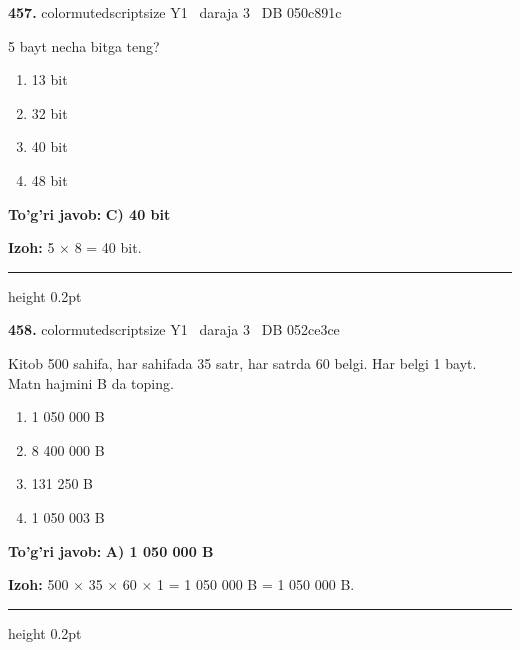 \documentclass[10pt,a4paper,oneside]{article}
\begin{document}
\noindent\textbf{\color{ink}457.}  {color{muted}scriptsize Y1 \textbullet\ daraja 3 \textbullet\ DB 050c891c}
\par
5 bayt necha bitga teng?
\begin{enumerate}[label=\Alph*),leftmargin=9mm]
\item 13 bit
\item 32 bit
\item 40 bit
\item 48 bit
\end{enumerate}
\begin{tcolorbox}[enhanced,breakable,colback=teal!4,colframe=teal!50!black,boxrule=0.5pt,arc=1.1mm,left=3mm,right=3mm,top=1.7mm,bottom=1.7mm,before skip=2mm,after skip=2mm]
\textbf{\color{teal}To'g'ri javob:} \textbf{C) 40 bit}
\par\smallskip
\textbf{Izoh:} 5 \ensuremath{\times} 8 = 40 bit.
\end{tcolorbox}
\vspace{2mm}\hrule height 0.2pt \vspace{3mm}

\noindent\textbf{\color{ink}458.}  {color{muted}scriptsize Y1 \textbullet\ daraja 3 \textbullet\ DB 052ce3ce}
\par
Kitob 500 sahifa, har sahifada 35 satr, har satrda 60 belgi. Har belgi 1 bayt. Matn hajmini B da toping.
\begin{enumerate}[label=\Alph*),leftmargin=9mm]
\item 1 050 000 B
\item 8 400 000 B
\item 131 250 B
\item 1 050 003 B
\end{enumerate}
\begin{tcolorbox}[enhanced,breakable,colback=teal!4,colframe=teal!50!black,boxrule=0.5pt,arc=1.1mm,left=3mm,right=3mm,top=1.7mm,bottom=1.7mm,before skip=2mm,after skip=2mm]
\textbf{\color{teal}To'g'ri javob:} \textbf{A) 1 050 000 B}
\par\smallskip
\textbf{Izoh:} 500 \ensuremath{\times} 35 \ensuremath{\times} 60 \ensuremath{\times} 1 = 1 050 000 B = 1 050 000 B.
\end{tcolorbox}
\vspace{2mm}\hrule height 0.2pt \vspace{3mm}
\end{document}
